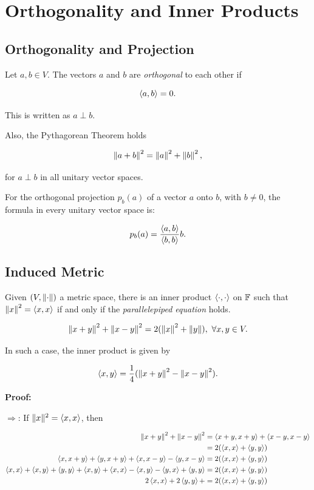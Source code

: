 \chapter{Orthogonality and Inner Products}

\section{Orthogonality and Projection}

Let \( a, b \in V \). The vectors \(a\) and \(b\) are \emph{orthogonal} to each other if

\[
    \left\langle a, b\right\rangle = 0.
\]

This is written as \( a \perp b \).

Also, the Pythagorean Theorem holds

\[
    \left\| a + b \right\|^2 = \left\| a \right\|^2 + \left\| b \right\|^2,
\]

for \( a \perp b \) in all unitary vector spaces.

For the orthogonal projection \( p_b(a) \) of a vector \(a\) onto \(b\), with \( b \neq 0 \), the 
formula in every unitary vector space is:

\[
    p_b(a) = \frac{\left\langle a, b\right\rangle}{\left\langle b, b\right\rangle} b.
\]

\section{Induced Metric}

Given \((V, \left\| \cdot \right\|)\) a metric space, there is an inner product \(\left\langle\cdot, \cdot\right\rangle\) on \(\mathbb{F}\) such that 
\(\left\| x \right\|^2 = \left\langle x, x\right\rangle\) if and only if the \emph{parallelepiped equation} holds. 

\[
    \left\| x + y \right\|^2 + \left\| x - y \right\|^2 = 2(\left\| x \right\|^2 + \left\| y \right\|), \ \forall x,y \in V.
\]

In such a case, the inner product is given by 

\[
    \left\langle x, y\right\rangle = \frac{1}{4} (\left\| x + y \right\|^2 - \left\| x - y \right\|^2).
\]

\textbf{Proof:}

\(\Rightarrow\): If \(\|x\|^2 = \left\langle x, x\right\rangle\), then 

\begin{align*} 
    \left\| x + y \right\|^2 + \left\| x - y \right\|^2 &= \left\langle x + y, x + y\right\rangle + \left\langle x - y, x - y\right\rangle \\ 
    &= 2 (\left\langle x, x\right\rangle + \left\langle y, y\right\rangle) \\ 
    \left\langle x, x + y\right\rangle + \left\langle y, x + y\right\rangle + \left\langle x, x - y\right\rangle - \left\langle y, x - y\right\rangle &= 2 (\left\langle x, x\right\rangle + \left\langle y, y\right\rangle) \\ 
    \left\langle x, x\right\rangle + \left\langle x, y\right\rangle + \left\langle y, y\right\rangle + \left\langle x, y\right\rangle + \left\langle x, x\right\rangle - \left\langle x, y\right\rangle - \left\langle y, x\right\rangle + \left\langle y, y\right\rangle &= 2 (\left\langle x, x\right\rangle + \left\langle y, y\right\rangle) \\ 
    2\left\langle x, x\right\rangle +  2\left\langle y, y\right\rangle +  &= 2 (\left\langle x, x\right\rangle + \left\langle y, y\right\rangle)
\end{align*}

